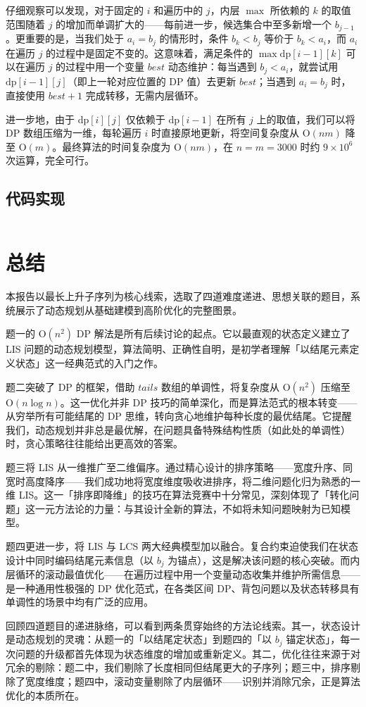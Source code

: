 \documentclass[12pt, a4paper]{academics}
\begin{document}
仔细观察可以发现，对于固定的 $i$ 和遍历中的 $j$，内层 $\max$ 所依赖的 $k$ 的取值范围随着 $j$ 的增加而单调扩大的——每前进一步，候选集合中至多新增一个 $b_{j-1}$。更重要的是，当我们处于 $a_i = b_j$ 的情形时，条件 $b_k < b_j$ 等价于 $b_k < a_i$，而 $a_i$ 在遍历 $j$ 的过程中是固定不变的。这意味着，满足条件的 $\max \mathrm{dp}[i-1][k]$ 可以在遍历 $j$ 的过程中用一个变量 $\mathit{best}$ 动态维护：每当遇到 $b_j < a_i$，就尝试用 $\mathrm{dp}[i-1][j]$（即上一轮对应位置的 DP 值）去更新 $\mathit{best}$；当遇到 $a_i = b_j$ 时，直接使用 $\mathit{best} + 1$ 完成转移，无需内层循环。

进一步地，由于 $\mathrm{dp}[i][j]$ 仅依赖于 $\mathrm{dp}[i-1]$ 在所有 $j$ 上的取值，我们可以将 DP 数组压缩为一维，每轮遍历 $i$ 时直接原地更新，将空间复杂度从 $\mathrm{O}(nm)$ 降至 $\mathrm{O}(m)$。最终算法的时间复杂度为 $\mathrm{O}(nm)$，在 $n = m = 3000$ 时约 $9 \times 10^6$ 次运算，完全可行。

\subsection{代码实现}

\inputminted{c++}{../src/p4_lcis.cpp}

\section{总结}

本报告以最长上升子序列为核心线索，选取了四道难度递进、思想关联的题目，系统展示了动态规划从基础建模到高阶优化的完整图景。

题一的 $\mathrm{O}(n^2)$ DP 解法是所有后续讨论的起点。它以最直观的状态定义建立了 LIS 问题的动态规划模型，算法简明、正确性自明，是初学者理解「以结尾元素定义状态」这一经典范式的入门之作。

题二突破了 DP 的框架，借助 $\mathit{tails}$ 数组的单调性，将复杂度从 $\mathrm{O}(n^2)$ 压缩至 $\mathrm{O}(n \log n)$。这一优化并非 DP 技巧的简单深化，而是算法范式的根本转变——从穷举所有可能结尾的 DP 思维，转向贪心地维护每种长度的最优结尾。它提醒我们，动态规划并非总是最优解，在问题具备特殊结构性质（如此处的单调性）时，贪心策略往往能给出更高效的答案。

题三将 LIS 从一维推广至二维偏序。通过精心设计的排序策略——宽度升序、同宽时高度降序——我们成功地将宽度维度吸收进排序，将二维问题化归为熟悉的一维 LIS。这一「排序即降维」的技巧在算法竞赛中十分常见，深刻体现了「转化问题」这一元方法论的力量：与其设计全新的算法，不如将未知问题映射为已知模型。

题四更进一步，将 LIS 与 LCS 两大经典模型加以融合。复合约束迫使我们在状态设计中同时编码结尾元素信息（以 $b_j$ 为锚点），这是解决该问题的核心突破。而内层循环的滚动最值优化——在遍历过程中用一个变量动态收集并维护所需信息——是一种通用性极强的 DP 优化范式，在各类区间 DP、背包问题以及状态转移具有单调性的场景中均有广泛的应用。

回顾四道题目的递进脉络，可以看到两条贯穿始终的方法论线索。其一，状态设计是动态规划的灵魂：从题一的「以结尾定状态」到题四的「以 $b_j$ 锚定状态」，每一次问题的升级都首先体现为状态维度的增加或重新定义。其二，优化往往来源于对冗余的剔除：题二中，我们剔除了长度相同但结尾更大的子序列；题三中，排序剔除了宽度维度；题四中，滚动变量剔除了内层循环——识别并消除冗余，正是算法优化的本质所在。
\end{document}
